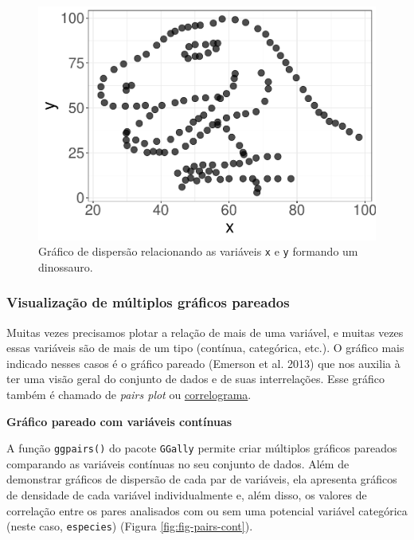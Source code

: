 \documentclass[
]{article}
\begin{document}
\begin{figure}
\centering
\includegraphics{epr_files/figure-latex/fig-scatter-dino-1.pdf}
\caption{\label{fig:fig-scatter-dino}Gráfico de dispersão relacionando as variáveis \texttt{x} e \texttt{y} formando um dinossauro.}
\end{figure}

\hypertarget{visualizauxe7uxe3o-de-muxfaltiplos-gruxe1ficos-pareados}{%
\subsubsection{Visualização de múltiplos gráficos pareados}\label{visualizauxe7uxe3o-de-muxfaltiplos-gruxe1ficos-pareados}}

Muitas vezes precisamos plotar a relação de mais de uma variável, e muitas vezes essas variáveis são de mais de um tipo (contínua, categórica, etc.). O gráfico mais indicado nesses casos é o gráfico pareado (Emerson et al. 2013) que nos auxilia à ter uma visão geral do conjunto de dados e de suas interrelações. Esse gráfico também é chamado de \emph{pairs plot} ou \href{https://www.data-to-viz.com/graph/correlogram.html}{correlograma}.

\textbf{Gráfico pareado com variáveis contínuas}

A função \texttt{ggpairs()} do pacote \texttt{GGally} permite criar múltiplos gráficos pareados comparando as variáveis contínuas no seu conjunto de dados. Além de demonstrar gráficos de dispersão de cada par de variáveis, ela apresenta gráficos de densidade de cada variável individualmente e, além disso, os valores de correlação entre os pares analisados com ou sem uma potencial variável categórica (neste caso, \texttt{especies}) (Figura \ref{fig:fig-pairs-cont}).
\end{document}
